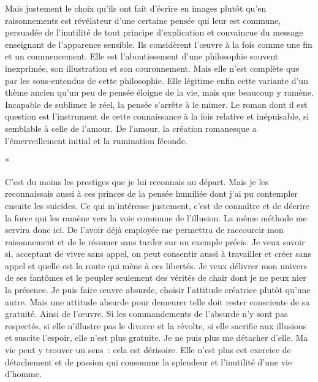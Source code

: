 \documentclass{book}
\begin{document}
Mais justement le choix qu'ils ont fait d'écrire en images plutôt qu'en raisonnements est révélateur d'une certaine pensée qui leur est commune, persuadée de l'inutilité de tout principe d'explication et convaincue du message enseignant de l'apparence sensible. Ils considèrent l'œuvre à la fois comme une fin et un commencement. Elle est l'aboutissement d'une philosophie souvent inexprimée, son illustration et son couronnement. Mais elle n'est complète que par les sous‑entendus de cette philosophie. Elle légitime enfin cette variante d'un thème ancien qu'un peu de pensée éloigne de la vie, mais que beaucoup y ramène. Incapable de sublimer le réel, la pensée s'arrête à le mimer. Le roman dont il est question est l'instrument de cette connaissance à la fois relative et inépuisable, si semblable à celle de l'amour. De l'amour, la création romanesque a l'émerveillement initial et la rumination féconde.

\begin{center}
*
\end{center}

C'est du moins les prestiges que je lui reconnais au départ. Mais je les reconnaissais aussi à ces princes de la pensée humiliée dont j'ai pu contempler ensuite les suicides. Ce qui m'intéresse justement, c'est de connaître et de décrire la force qui les ramène vers la voie commune de l'illusion. La même méthode me servira donc ici. De l'avoir déjà employée me permettra de raccourcir mon raisonnement et de le résumer sans tarder sur un exemple précis. Je veux savoir si, acceptant de vivre sans appel, on peut consentir aussi à travailler et créer sans appel et quelle est la route qui mène à ces libertés. Je veux délivrer mon univers de ses fantômes et le peupler seulement des vérités de chair dont je ne peux nier la présence. Je puis faire œuvre absurde, choisir l'attitude créatrice plutôt qu'une autre. Mais une attitude absurde pour demeurer telle doit rester consciente de sa gratuité. Ainsi de l'œuvre. Si les commandements de l'absurde n'y sont pas respectés, si elle n'illustre pas le divorce et la révolte, si elle sacrifie aux illusions et suscite l'espoir, elle n'est plus gratuite. Je ne puis plus me détacher d'elle. Ma vie peut y trouver un sens : cela est dérisoire. Elle n'est plus cet exercice de détachement et de passion qui consomme la splendeur et l'inutilité d'une vie d'homme.
\end{document}
